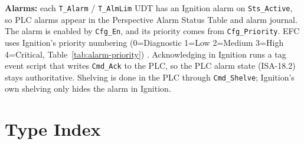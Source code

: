 \textbf{Alarms:} each \texttt{T\_Alarm} /\allowbreak{} \texttt{T\_AlmLim} UDT has an Ignition alarm on \texttt{Sts\_Active}, so PLC alarms appear in the Perspective Alarm Status Table and alarm journal. The alarm is enabled by \texttt{Cfg\_En}, and its priority comes from \texttt{Cfg\_Priority}. EFC uses Ignition's priority numbering (0=Diagnostic 1=Low 2=Medium 3=High 4=Critical, Table~\ref{tab:alarm-priority}) \newmark.
 Acknowledging in Ignition runs a tag event script that writes \texttt{Cmd\_Ack} to the PLC, so the PLC alarm state (ISA-18.2) stays authoritative. Shelving is done in the PLC through \texttt{Cmd\_Shelve}; Ignition's own shelving only hides the alarm in Ignition.

\section{Type Index}


